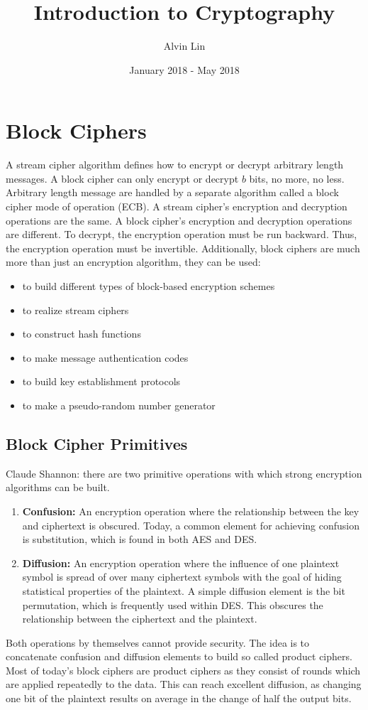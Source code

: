 \documentclass{math}
\title{Introduction to Cryptography}
\author{Alvin Lin}
\date{January 2018 - May 2018}
\begin{document}
\maketitle

\section*{Block Ciphers}
A stream cipher algorithm defines how to encrypt or decrypt arbitrary length
messages. A block cipher can only encrypt or decrypt \( b \) bits, no more, no
less. Arbitrary length message are handled by a separate algorithm called a
block cipher mode of operation (ECB). A stream cipher's encryption and
decryption operations are the same. A block cipher's encryption and decryption
operations are different. To decrypt, the encryption operation must be run
backward. Thus, the encryption operation must be invertible. Additionally, block
ciphers are much more than just an encryption algorithm, they can be used:
\begin{itemize}
  \item to build different types of block-based encryption schemes
  \item to realize stream ciphers
  \item to construct hash functions
  \item to make message authentication codes
  \item to build key establishment protocols
  \item to make a pseudo-random number generator
\end{itemize}

\subsection*{Block Cipher Primitives}
Claude Shannon: there are two primitive operations with which strong encryption
algorithms can be built.
\begin{enumerate}
  \item \textbf{Confusion:} An encryption operation where the relationship
  between the key and ciphertext is obscured. Today, a common element for
  achieving confusion is substitution, which is found in both AES and DES.
  \item \textbf{Diffusion:} An encryption operation where the influence of one
  plaintext symbol is spread of over many ciphertext symbols with the goal of
  hiding statistical properties of the plaintext. A simple diffusion element is
  the bit permutation, which is frequently used within DES. This obscures the
  relationship between the ciphertext and the plaintext.
\end{enumerate}
Both operations by themselves cannot provide security. The idea is to
concatenate confusion and diffusion elements to build so called product ciphers.
Most of today's block ciphers are product ciphers as they consist of rounds
which are applied repeatedly to the data. This can reach excellent diffusion, as
changing one bit of the plaintext results on average in the change of half the
output bits.
\end{document}
